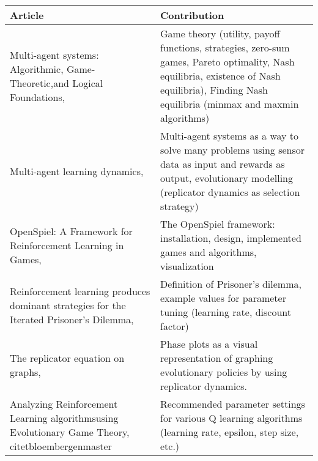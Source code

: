 \documentclass[10pt,a4paper]{article}
\begin{document}
\bigskip
\begin{tabular}{|p{4cm}|p{9cm}|}
\hline 
Article & Contribution \\ 
\hline 
\hline
Multi-agent systems: Algorithmic, Game-Theoretic,and Logical Foundations, \citet{mas} & Game theory  (utility, payoff functions, strategies, zero-sum games, Pareto optimality, Nash equilibria, existence of Nash equilibria), Finding Nash equilibria (minmax and maxmin algorithms)  \\ 
\hline 
Multi-agent learning dynamics, \citet{phdthesis} &  Multi-agent systems as a way to solve many problems using sensor data as input and rewards as output, evolutionary modelling (replicator dynamics as selection strategy) \\
\hline 
OpenSpiel: A Framework for Reinforcement Learning in Games, \citet{lanctot2019openspiel} & The OpenSpiel framework: installation, design, implemented games and algorithms, visualization \\ 
\hline 
Reinforcement learning produces dominant strategies for the Iterated Prisoner’s Dilemma, \citet{rlforpd} & Definition of Prisoner's dilemma, example values for parameter tuning (learning rate, discount factor) \\ 
\hline 
The replicator equation on graphs, \citet{Ohtsuki2006TheRE} & Phase plots as a visual representation of graphing evolutionary policies by using replicator dynamics. \\
\hline
Analyzing Reinforcement Learning algorithmsusing Evolutionary Game Theory, citet{bloembergenmaster} & Recommended parameter settings for various Q learning algorithms (learning rate, epsilon, step size, etc.) \\
\end{tabular} 


{}

\end{document}
